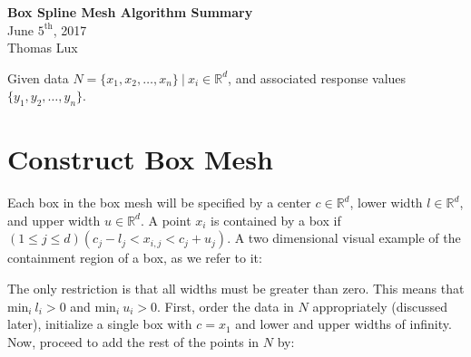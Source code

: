 \documentclass[11pt,margin=1in]{article}
\begin{document}
\begin{center}
  \textbf{Box Spline Mesh Algorithm Summary}\\
  June $\text{5}^\text{th}$, 2017\\
  Thomas Lux
\end{center}


Given data $N = \{x_1, x_2, \dots, x_n\}\ |\  x_i \in \mathbb{R}^d$, and
associated response values $\{y_1, y_2, \dots, y_n \}$.

\section{Construct Box Mesh}
Each box in the box mesh will be specified by a center $c \in \mathbb{R}^d$,
lower width $l \in \mathbb{R}^d$, and upper width $u \in \mathbb{R}^d$. 
A point $x_i$ is contained by a box if $(1 \leq j \leq d) (c_j - l_j < x_{i,j} < c_j + u_j)$.
A two dimensional visual example of the containment region of a box, as we refer to it:

\vspace{1mm}

\begin{center}
\end{center}

The only restriction is that all widths must be greater than
zero. This means that $\text{min}_i\ l_i > 0 $ and $\text{min}_i\ u_i
> 0$. First, order the data in $N$ appropriately (discussed later),
initialize a single box with $c = x_1$ and lower and upper widths of
infinity.  Now, proceed to add the rest of the points in $N$ by:

\vspace{3mm}
\end{document}
